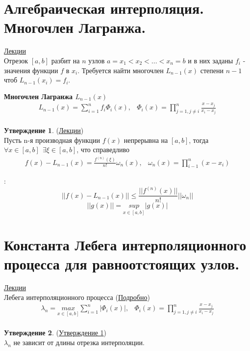 \documentclass[specialist, subf, href, colorlinks=true, 12pt, times, mtpro, final]{disser}
\theoremstyle{definition}
\newtheorem{state}{Утверждение}[section]
\begin{document}
\section {Алгебраическая интерполяция. Многочлен Лагранжа.}
    \hyperlink {lects.15}{Лекции}\\
    Отрезок $[a,b]$ разбит на $n$ узлов $a = x_1 < x_2 < ... < x_n = b$ и в них заданы $f_i$ - значения функции $f$ в $x_i$. Требуется найти многочлен $L_{n-1}(x)$ степени $n - 1$ чтоб $L_{n - 1}(x_i) = f_i$.

    \noindent\textbf{Многочлен Лагранжа $L_{n - 1}(x)$}
    $$
        \begin {array}{lr}
        L_{n - 1}(x) = \sum\limits_{i = 1}^{n} f_i \Phi_i (x), & \Phi_i(x) = \prod\limits_{j = 1, j\ne i}^{n} \frac{x-x_j}{x_i - x_j} \\
        \end {array}
    $$

    \begin{state} (\hyperlink {lects.16}{Лекции})\\
    Пусть n-я производная функции $f(x)$ непрерывна на $[a,b]$, тогда $\forall x \in [a,b] \ \  \exists \xi \in [a,b]$, что справедливо
        $$
            \begin{array}{lr}
            f(x) - L_{n-1}(x) = \frac {f^{(n)}(\xi)}{n!} \omega_n(x), & \omega_n(x) = \prod\limits_{i - 1}^{n}(x-x_i)
            \end{array}
        $$
    \end{state}
    :
    $$
        ||f(x) - L_{n-1}(x) || \le \frac{||f^{(n)}(x)||}{n!} ||\omega_n||
    $$
    $$
        ||g(x)|| = \underset{x\in [a,b]}{sup} |g(x)|
    $$


\section {Константа Лебега интерполяционного процесса для равноотстоящих узлов.}
    \hyperlink {lects.17}{Лекции}\\
    { Лебега интерполяционного процесса} (\hyperlink {lects.17}{Подробно})
    $$
        \begin{array}{lr}
        \lambda_n = \underset{x\in [a,b]}{max} \sum\limits_{i = 1}^n |\Phi_i(x)|, & \Phi_i(x) = \prod\limits_{j = 1, j\ne i}^{n} \frac{x-x_j}{x_i - x_j} \\
        \end{array}
    $$
    
    \begin{state} (\hyperlink {lects.17}{Утверждение 1})\\
    $\lambda_n$ не зависит от длины отрезка интерполяции.
    \end{state}
    
\end{document}
